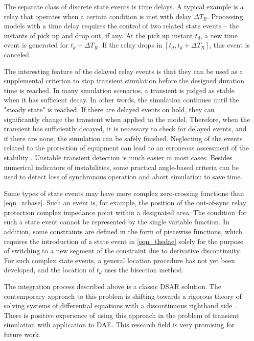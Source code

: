 \documentclass[lettersize,journal]{IEEEtran}
\begin{document}
The separate class of discrete state events is time delays. A typical example is a relay that operates when a certain condition is met with delay \(\Delta T_R\). Processing models with a time delay requires the control of two related state events -- the instants of pick up and drop out, if any. At the pick up instant \(t_d\), a new time event is generated for \(t_d+\Delta T_R\). If the relay drops in \(\left[t_d, t_d+\Delta T_R \right]\), this event is canceled.

The interesting feature of the delayed relay events is that they can be used as a supplemental criterion to stop transient simulation before the designed duration time is reached. In many simulation scenarios, a transient is judged as stable when it has sufficient decay. In other words, the simulation continues until the "steady state" is reached. If there are delayed events on hold, they can significantly change the transient when applied to the model. Therefore, when the transient has sufficiently decayed, it is necessary to check for delayed events, and if there are none, the simulation can be safely finished. Neglecting of the events related to the protection of equipment can lead to an erroneous assessment of the stability \cite{VanCutsem2020}. Unstable transient detection is much easier in most cases. Besides numerical indicators of instabilities, some practical angle-based criteria can be used to detect loss of synchronous operation and abort simulation to save time.

Some types of state events may have more complex zero-crossing functions than \eqref{eqn_zcbase}. Such an event is, for example, the position of the out-of-sync relay protection complex impedance point within a designated area. The condition for such a state event cannot be represented by the single variable function. In addition, some constraints are defined in the form of piecewise functions, which requires the introduction of a state event in \eqref{eqn_thedae} solely for the purpose of switching to a new segment of the constraint due to derivative discontinuity. For such complex state events, a general location procedure has not yet been developed, and the location of \(t_d\) uses the bisection method.

The integration process described above is a classic DSAR solution. The contemporary approach to this problem is shifting towards a rigorous theory of solving systems of differential equations with a discontinuous righthand side \cite{Filippov1988}. There is positive experience of using this approach in the problem of transient simulation \cite{Murad2019} with application to DAE. This research field is very promising for future work.
\end{document}
